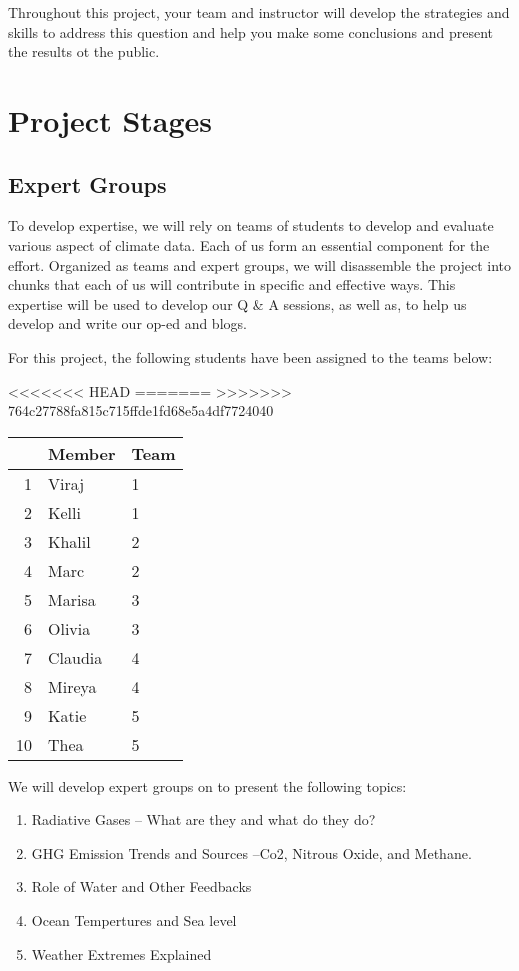 \documentclass{article}\usepackage[]{graphicx}\usepackage[]{color}
\begin{document}
Throughout this project, your team and instructor will develop the strategies and skills to address this question and help you make some conclusions and present the results ot the public.

\section{Project Stages}

\subsection{Expert Groups}

To develop expertise, we will rely on teams of students to develop and evaluate various aspect of climate data. Each of us form an essential component for the effort. Organized as teams and expert groups, we will disassemble the project into chunks that each of us will contribute in specific and effective ways. This expertise will be used to develop our Q \& A sessions, as well as, to help us develop and write our op-ed and blogs.

For this project, the following students have been assigned to the teams below:

<<<<<<< HEAD
=======
>>>>>>> 764c27788fa815c715ffde1fd68e5a4df7724040
\begin{table}[ht]
\centering
\begin{tabular}{rll}
  \hline
 & Member & Team \\ 
  \hline
1 & Viraj & 1 \\ 
  2 & Kelli & 1 \\ 
  3 & Khalil & 2 \\ 
  4 & Marc & 2 \\ 
  5 & Marisa & 3 \\ 
  6 & Olivia & 3 \\ 
  7 & Claudia & 4 \\ 
  8 & Mireya & 4 \\ 
  9 & Katie & 5 \\ 
  10 & Thea & 5 \\ 
   \hline
\end{tabular}
\end{table}


We will develop expert groups on to present the following topics:

\begin{enumerate}
  \item Radiative Gases -- What are they and what do they do?
  \item GHG Emission Trends and Sources --Co2, Nitrous Oxide, and Methane.
  \item Role of Water and Other Feedbacks
  \item Ocean Tempertures and Sea level
  \item Weather Extremes Explained
\end{enumerate}
\end{document}

